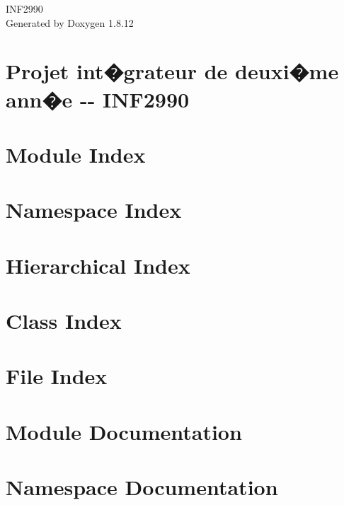 \documentclass[twoside]{book}
\newcommand{\+}{\discretionary{\mbox{\scriptsize$\hookleftarrow$}}{}{}}
\newcommand{\clearemptydoublepage}{%
  \newpage{\pagestyle{empty}\cleardoublepage}%
}
\begin{document}
\hypersetup{pageanchor=false,
             bookmarksnumbered=true,
             pdfencoding=unicode
            }
\begin{titlepage}
\vspace*{7cm}
\begin{center}%
{\Large I\+N\+F2990 }\\
\vspace*{1cm}
{\large Generated by Doxygen 1.8.12}\\
\end{center}
\end{titlepage}
\clearemptydoublepage
{}
\tableofcontents
\clearemptydoublepage
{}
\hypersetup{pageanchor=true}

\chapter{Projet int�grateur de deuxi�me ann�e -\/-\/ I\+N\+F2990}
\label{index}\hypertarget{index}{}
\chapter{Module Index}

\chapter{Namespace Index}

\chapter{Hierarchical Index}

\chapter{Class Index}

\chapter{File Index}

\chapter{Module Documentation}

\chapter{Namespace Documentation}



\end{document}
